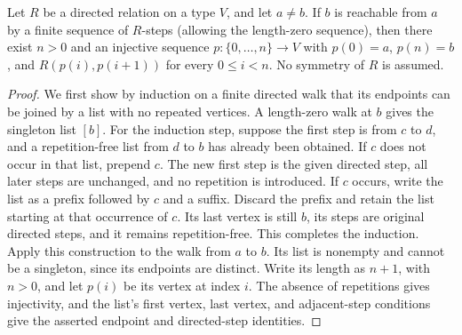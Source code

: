 \begin{lemma}
Let $R$ be a directed relation on a type $V$, and let $a\ne b$.
If $b$ is reachable from $a$ by a finite sequence of $R$-steps
(allowing the length-zero sequence), then there exist $n>0$ and an
injective sequence $p:\{0,\ldots,n\}\to V$ with $p(0)=a$,
$p(n)=b$, and $R(p(i),p(i+1))$ for every $0\le i<n$.
No symmetry of $R$ is assumed.
\end{lemma}
\begin{proof}
We first show by induction on a finite directed walk that its endpoints
can be joined by a list with no repeated vertices. A length-zero walk
at $b$ gives the singleton list $[b]$. For the induction step, suppose
the first step is from $c$ to $d$, and a repetition-free list from $d$
to $b$ has already been obtained. If $c$ does not occur in that list,
prepend $c$. The new first step is the given directed step, all later
steps are unchanged, and no repetition is introduced. If $c$ occurs,
write the list as a prefix followed by $c$ and a suffix. Discard the
prefix and retain the list starting at that occurrence of $c$.
Its last vertex is still $b$, its steps are original directed steps,
and it remains repetition-free. This completes the induction.
Apply this construction to the walk from $a$ to $b$. Its list is
nonempty and cannot be a singleton, since its endpoints are distinct.
Write its length as $n+1$, with $n>0$, and let $p(i)$ be its vertex
at index $i$. The absence of repetitions gives injectivity, and the
list's first vertex, last vertex, and adjacent-step conditions give
the asserted endpoint and directed-step identities.
\end{proof}
